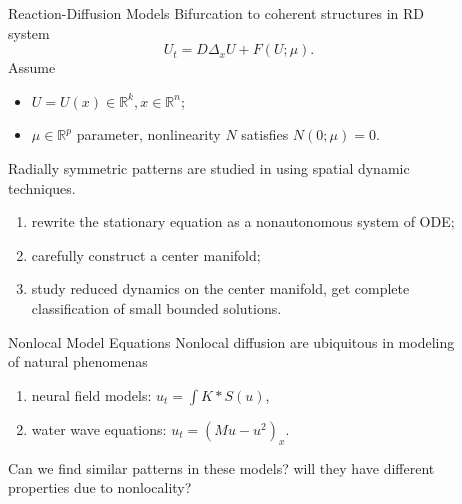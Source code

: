 \documentclass[final]{beamer}
\newlength{\sepwid}
\newlength{\onecolwid}
\newlength{\twocolwid}
\begin{document}
\begin{frame}[t]
\begin{columns}[t]
\begin{column}{\onecolwid}

\begin{block}{Reaction-Diffusion Models}
Bifurcation to coherent structures in RD system
\[
U_t = D\Delta_x U + F(U; \mu).
\]
Assume
\begin{itemize}
\item $U=U(x) \in \mathbb{R}^k, x\in \mathbb{R}^n$;
\item $\mu \in \mathbb{R}^p$ parameter, nonlinearity $N$ satisfies $N(0;\mu)=0$.
\end{itemize}
Radially symmetric patterns are studied in \cite{srad} using spatial dynamic techniques.
\begin{enumerate}
\item rewrite the stationary equation as a nonautonomous system of ODE; 
\item carefully construct a center manifold; 
\item study reduced dynamics on the center manifold, get complete classification of small bounded solutions.
\end{enumerate}
\end{block}

\begin{block}{Nonlocal Model Equations}
Nonlocal diffusion are ubiquitous in modeling of natural phenomenas \cite{neuralfieldrev}
\begin{enumerate}
\item neural field models: $u_t = \int K\ast S(u)$, 
\item water wave equations: $u_t = (Mu-u^2)_x$.
\end{enumerate}

Can we find similar patterns in these models? will they have different properties due to nonlocality?
\end{block}


\end{column} %

\begin{column}{\sepwid}\end{column} %

\begin{column}{\twocolwid} %


\end{column}
\end{columns}
\end{frame}
\end{document}
